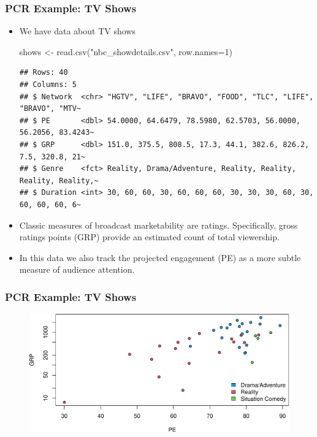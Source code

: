 \documentclass[
  shownotes,
  xcolor={svgnames},
  hyperref={colorlinks,citecolor=DarkBlue,linkcolor=DarkRed,urlcolor=DarkBlue}
  , aspectratio=169]{beamer}
\newenvironment{Shaded}{\begin{snugshade}}{\end{snugshade}}
\newcommand{\AttributeTok}[1]{\textcolor[rgb]{0.77,0.63,0.00}{#1}}
\newcommand{\DecValTok}[1]{\textcolor[rgb]{0.00,0.00,0.81}{#1}}
\newcommand{\FunctionTok}[1]{\textcolor[rgb]{0.00,0.00,0.00}{#1}}
\newcommand{\NormalTok}[1]{#1}
\newcommand{\OtherTok}[1]{\textcolor[rgb]{0.56,0.35,0.01}{#1}}
\newcommand{\StringTok}[1]{\textcolor[rgb]{0.31,0.60,0.02}{#1}}
\begin{document}
\begin{frame}[fragile]
\frametitle{PCR Example: TV Shows}

\begin{itemize}
  \item We have data about TV shows
\medskip
\begin{scriptsize}

  \begin{Shaded}
\begin{Highlighting}[]
\NormalTok{shows }\OtherTok{\textless{}{-}} \FunctionTok{read.csv}\NormalTok{(}\StringTok{"nbc\_showdetails.csv"}\NormalTok{, }\AttributeTok{row.names=}\DecValTok{1}\NormalTok{) }
\end{Highlighting}
\end{Shaded}

\end{scriptsize}
\begin{tiny}



\begin{verbatim}
## Rows: 40
## Columns: 5
## $ Network  <chr> "HGTV", "LIFE", "BRAVO", "FOOD", "TLC", "LIFE", "BRAVO", "MTV~
## $ PE       <dbl> 54.0000, 64.6479, 78.5980, 62.5703, 56.0000, 56.2056, 83.4243~
## $ GRP      <dbl> 151.0, 375.5, 808.5, 17.3, 44.1, 382.6, 826.2, 7.5, 320.8, 21~
## $ Genre    <fct> Reality, Drama/Adventure, Reality, Reality, Reality, Reality,~
## $ Duration <int> 30, 60, 60, 30, 60, 60, 60, 30, 30, 30, 60, 30, 60, 60, 60, 6~
\end{verbatim}

\end{tiny}
\medskip
\item Classic measures of broadcast marketability are ratings. Specifically, gross ratings points (GRP) provide an estimated count of total viewership. 
\medskip
\item In this data we also track the projected engagement (PE) as a more subtle measure of audience attention.
\end{itemize}



\end{frame}
\begin{frame}[fragile]
\frametitle{PCR Example: TV Shows}

 \begin{figure}[H] \centering
            \captionsetup{justification=centering}
              \includegraphics[scale=.7]{figures/unnamed-chunk-1-1.pdf}
 \end{figure}


\end{frame}
\end{document}
